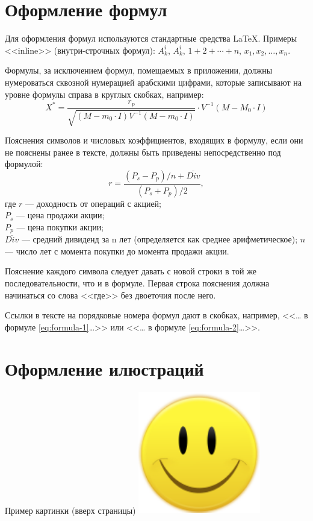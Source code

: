 \documentclass[PI]{LabHSE}
\begin{document}
\section{Оформление формул}

Для оформления формул используются стандартные средства \LaTeX{}. Примеры <<inline>> (внутри-строчных формул): $A^i_k$, $A_k^i$, $1+2+\cdots+n$, $x_1, x_2, \dots, x_n$.

Формулы, за исключением формул, помещаемых в приложении, должны нумероваться сквозной нумерацией арабскими цифрами, которые записывают на уровне формулы справа в круглых скобках, например:
\begin{equation}
	X^* = \frac{r_p}{\sqrt{(M-m_0\cdot I)V^{-1}(M-m_0\cdot I)}}\cdot V^{-1}(M-M_0\cdot I)
	\label{eq:formula-1}
\end{equation}

Пояснения символов и числовых коэффициентов, входящих в формулу, если они не пояснены ранее в тексте, должны быть приведены непосредственно под формулой:
\begin{equation}
	r = \frac{(P_s-P_p)/n + \overline{Div}}{(P_s + P_p)/2},
	\label{eq:formula-2}
\end{equation}
где $r$ --- доходность от операций с акцией;\\
$P_s$ --- цена продажи акции;\\
$P_p$ --- цена покупки акции;\\
$\overline{Div}$ --- средний дивиденд за n лет (определяется как среднее арифметическое); 
$n$ --- число лет с момента покупки до момента продажи акции.

Пояснение каждого символа следует давать с новой строки в той же последовательности, что и в формуле. Первая строка пояснения должна начинаться со слова <<где>> без двоеточия после него.

Ссылки в тексте на порядковые номера формул дают в скобках, например, <<\dots{} в формуле \eqref{eq:formula-1}\dots>> или <<\dots{} в формуле \eqref{eq:formula-2}\dots>>.

\section{Оформление илюстраций}

\begin{FIGURE}[t]{Пример картинки (вверх страницы)\label{fig:example-figure}}
	\includegraphics[width=0.4\textwidth]{img/fig}
\end{FIGURE}
\end{document}
